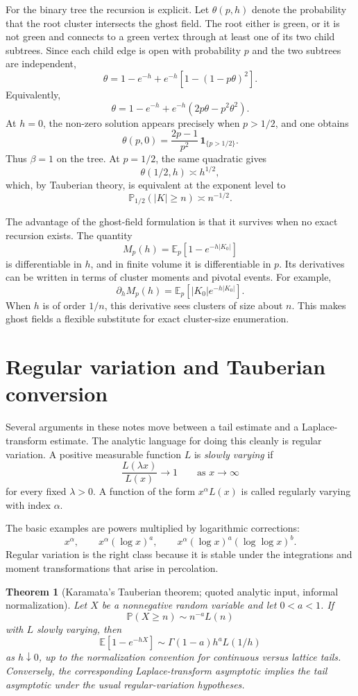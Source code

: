\documentclass[11pt,reqno]{book}
\numberwithin{equation}{chapter}
\theoremstyle{plain}
\newtheorem{theorem}{Theorem}[chapter]
\theoremstyle{definition}
\theoremstyle{remark}
\renewcommand{\P}{\mathbb P}
\newcommand{\E}{\mathbb E}
\newcommand{\1}{\mathbf 1}
\newcommand{\as}{\asymp}
\begin{document}
For the binary tree the recursion is explicit. Let $\theta(p,h)$ denote the probability that the root cluster intersects the ghost field. The root either is green, or it is not green and connects to a green vertex through at least one of its two child subtrees. Since each child edge is open with probability $p$ and the two subtrees are independent,
\[
  \theta
  =
  1-e^{-h}
  +
  e^{-h}\left[1-(1-p\theta)^2\right].
\]
Equivalently,
\[
  \theta
  =
  1-e^{-h}
  +
  e^{-h}(2p\theta-p^2\theta^2).
\]
At $h=0$, the non-zero solution appears precisely when $p>1/2$, and one obtains
\[
  \theta(p,0)=\frac{2p-1}{p^2}\,\1_{\{p>1/2\}}.
\]
Thus $\beta=1$ on the tree. At $p=1/2$, the same quadratic gives
\[
  \theta(1/2,h)\as h^{1/2},
\]
which, by Tauberian theory, is equivalent at the exponent level to
\[
  \P_{1/2}(|K|\geq n)\as n^{-1/2}.
\]

The advantage of the ghost-field formulation is that it survives when no exact recursion exists. The quantity
\[
  M_p(h)=\E_p[1-e^{-h|K_0|}]
\]
is differentiable in $h$, and in finite volume it is differentiable in $p$. Its derivatives can be written in terms of cluster moments and pivotal events. For example,
\[
  \partial_h M_p(h)=\E_p\left[|K_0|e^{-h|K_0|}\right].
\]
When $h$ is of order $1/n$, this derivative sees clusters of size about $n$. This makes ghost fields a flexible substitute for exact cluster-size enumeration.

\section{Regular variation and Tauberian conversion}

Several arguments in these notes move between a tail estimate and a Laplace-transform estimate. The analytic language for doing this cleanly is regular variation. A positive measurable function $L$ is \emph{slowly varying} if
\[
  \frac{L(\lambda x)}{L(x)}\longrightarrow 1
  \qquad\text{as }x\to\infty
\]
for every fixed $\lambda>0$. A function of the form $x^\alpha L(x)$ is called regularly varying with index $\alpha$.

The basic examples are powers multiplied by logarithmic corrections:
\[
  x^\alpha,\qquad
  x^\alpha(\log x)^a,\qquad
  x^\alpha(\log x)^a(\log\log x)^b.
\]
Regular variation is the right class because it is stable under the integrations and moment transformations that arise in percolation.

\begin{theorem}[Karamata's Tauberian theorem; quoted analytic input, informal normalization]
Let $X$ be a nonnegative random variable and let $0<a<1$. If
\[
  \P(X\geq n)\sim n^{-a}L(n)
\]
with $L$ slowly varying, then
\[
  \E[1-e^{-hX}]
  \sim
  \Gamma(1-a) h^a L(1/h)
\]
as $h\downarrow 0$, up to the normalization convention for continuous versus lattice tails. Conversely, the corresponding Laplace-transform asymptotic implies the tail asymptotic under the usual regular-variation hypotheses.
\end{theorem}
\end{document}
